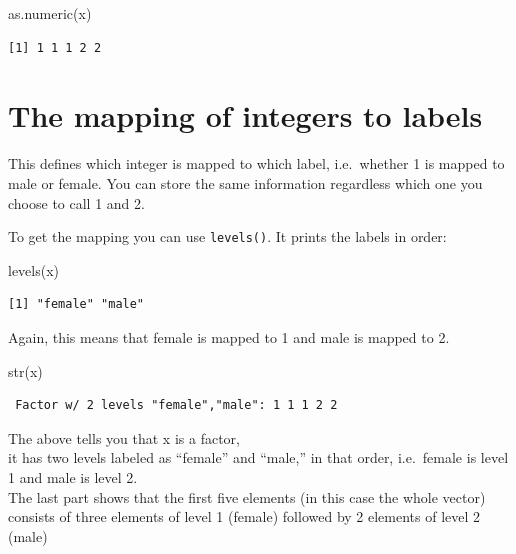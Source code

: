 \documentclass[
]{book}
\newenvironment{Shaded}{\begin{snugshade}}{\end{snugshade}}
\newcommand{\FunctionTok}[1]{\textcolor[rgb]{0.00,0.00,0.00}{#1}}
\newcommand{\NormalTok}[1]{#1}
\begin{document}
\begin{Shaded}
\begin{Highlighting}[]
\FunctionTok{as.numeric}\NormalTok{(x)}
\end{Highlighting}
\end{Shaded}

\begin{verbatim}
[1] 1 1 1 2 2
\end{verbatim}

\hypertarget{the-mapping-of-integers-to-labels}{%
\section{\texorpdfstring{The \textbf{mapping of integers to labels}}{The mapping of integers to labels}}\label{the-mapping-of-integers-to-labels}}

This defines which integer is mapped to which label, i.e.~whether 1 is mapped to male or female. You can store the same information regardless which one you choose to call 1 and 2.

To get the mapping you can use \texttt{levels()}. It prints the labels in order:

\begin{Shaded}
\begin{Highlighting}[]
\FunctionTok{levels}\NormalTok{(x)}
\end{Highlighting}
\end{Shaded}

\begin{verbatim}
[1] "female" "male"  
\end{verbatim}

Again, this means that female is mapped to 1 and male is mapped to 2.

\begin{Shaded}
\begin{Highlighting}[]
\FunctionTok{str}\NormalTok{(x)}
\end{Highlighting}
\end{Shaded}

\begin{verbatim}
 Factor w/ 2 levels "female","male": 1 1 1 2 2
\end{verbatim}

The above tells you that x is a factor,\\
it has two levels labeled as ``female'' and ``male,'' in that order, i.e.~female is level 1 and male is level 2.\\
The last part shows that the first five elements (in this case the whole vector) consists of three elements of level 1 (female) followed by 2 elements of level 2 (male)
\end{document}
